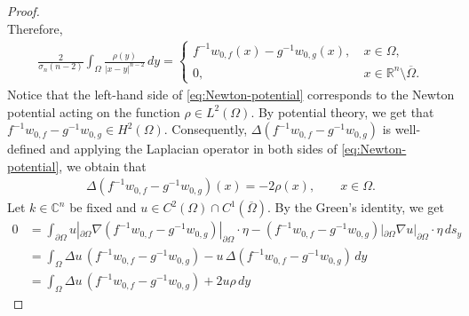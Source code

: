 \documentclass[12pt]{article}
\def\R{\mathbb{R}}
\begin{document}
\begin{proof}
\begin{equation*}
\end{equation*}
Therefore,
\begin{align}\label{eq:Newton-potential}
\frac{2}{\sigma_n(n-2)}\int_{\Omega} \frac{\rho(y)}{|x-y|^{n-2}}\, dy=\left\{
   \begin{array}{ll}
      f^{-1}w_{0,f}(x)-g^{-1}w_{0,g}(x), \ & x\in \Omega,\\
      0,           & x\in \R^n\setminus \overline{\Omega}.
   \end{array}
\right.
\end{align}
Notice that the left-hand side of \eqref{eq:Newton-potential} corresponds to the Newton potential acting on the function $\rho\in L^2(\Omega)$. By potential theory, we get that $f^{-1}w_{0,f}-g^{-1}w_{0,g}\in H^2(\Omega)$.
Consequently, $\Delta (f^{-1}w_{0,f}-g^{-1}w_{0,g})$ is well-defined 
and applying the Laplacian operator in both sides of \eqref{eq:Newton-potential}, we obtain that
\begin{align}\label{eq:uniqueness-1}
\Delta(f^{-1}w_{0,f}-g^{-1}w_{0,g})(x)=-2\rho(x), \qquad x\in \Omega.
\end{align}
Let $k\in \mathbb{C}^n$ be fixed and $u\in C^2(\Omega)\cap C^1(\overline{\Omega})$. By the Green's identity, we get
\begin{align*}
    0&=\int_{\partial\Omega} u|_{\partial\Omega}\nabla (f^{-1}w_{0,f}-g^{-1}w_{0,g})|_{\partial\Omega}\cdot \eta-(f^{-1}w_{0,f}-g^{-1}w_{0,g})|_{\partial\Omega}\nabla u|_{\partial\Omega}\cdot \eta\, ds_y\\
    &=\int_{\Omega}\Delta u\,(f^{-1}w_{0,f}-g^{-1}w_{0,g})-u\, \Delta(f^{-1}w_{0,f}-g^{-1}w_{0,g})\,  dy\\
    &=\int_{\Omega}\Delta u\,(f^{-1}w_{0,f}-g^{-1}w_{0,g})+ 2u \rho\, dy

\end{align*}
\end{proof}
\end{document}

